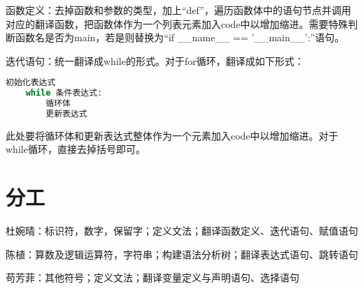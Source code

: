 \documentclass{article}
\begin{document}
函数定义：去掉函数和参数的类型，加上“def”，遍历函数体中的语句节点并调用对应的翻译函数，把函数体作为一个列表元素加入code中以增加缩进。需要特殊判断函数名是否为main，若是则替换为“if \_\_name\_\_ == '\_\_main\_\_':”语句。

迭代语句：统一翻译成while的形式。对于for循环，翻译成如下形式：
\begin{lstlisting}[language=Python]
    初始化表达式
    while 条件表达式:
        循环体
        更新表达式
\end{lstlisting}
此处要将循环体和更新表达式整体作为一个元素加入code中以增加缩进。对于while循环，直接去掉括号即可。
\section{分工}
杜婉晴：标识符，数字，保留字；定义文法；翻译函数定义、迭代语句、赋值语句

陈植：算数及逻辑运算符，字符串；构建语法分析树；翻译表达式语句、跳转语句

苟芳菲：其他符号；定义文法；翻译变量定义与声明语句、选择语句
\end{document}
